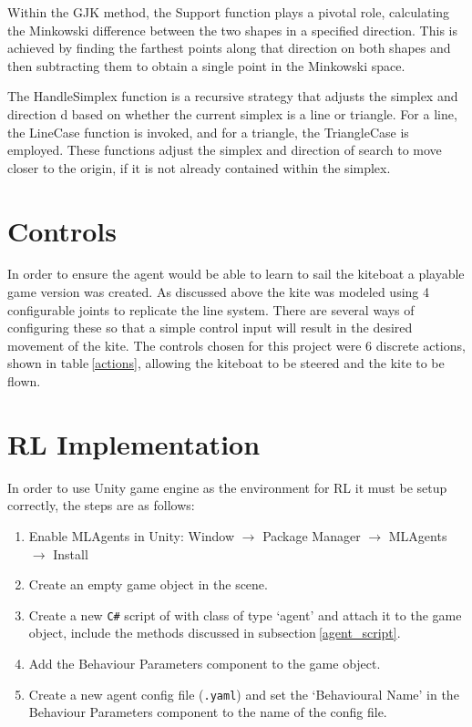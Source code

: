 Within the GJK method, the Support function plays a pivotal role, calculating the Minkowski difference between the two shapes in a specified direction. This is achieved by finding the farthest points along that direction on both shapes and then subtracting them to obtain a single point in the Minkowski space.

The HandleSimplex function is a recursive strategy that adjusts the simplex and direction d based on whether the current simplex is a line or triangle. For a line, the LineCase function is invoked, and for a triangle, the TriangleCase is employed. These functions adjust the simplex and direction of search to move closer to the origin, if it is not already contained within the simplex.


\section{Controls}
In order to ensure the agent would be able to learn to sail the kiteboat a playable game version was created. As discussed above the kite was modeled using 4 configurable joints to replicate the line system. There are several ways of configuring these so that a simple control input will result in the desired movement of the kite. The controls chosen for this project were 6 discrete actions, shown in table$~$\ref{actions}, allowing the kiteboat to be steered and the kite to be flown. 


\section{RL Implementation}\label{sec:RL_Implementation}

In order to use Unity game engine as the environment for RL it must be setup correctly, the steps are as follows:
\begin{enumerate}
    \item Enable MLAgents in Unity:
    Window $\rightarrow$ Package Manager $\rightarrow$ MLAgents $\rightarrow$ Install
    \item Create an empty game object in the scene.
    \item Create a new \texttt{C\#} script of with class of type `agent' and attach it to the game object, include the methods discussed in subsection$~$\ref{agent_script}.
    \item Add the Behaviour Parameters component to the game object.
    \item Create a new agent config file (\texttt{.yaml}) and set the `Behavioural Name' in the Behaviour Parameters component to the name of the config file.
\end{enumerate}  

